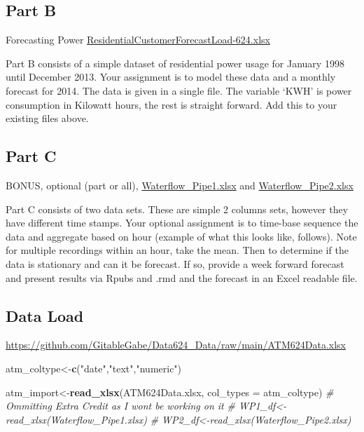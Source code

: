 \documentclass[
]{article}
\newenvironment{Shaded}{\begin{snugshade}}{\end{snugshade}}
\newcommand{\AttributeTok}[1]{\textcolor[rgb]{0.13,0.29,0.53}{#1}}
\newcommand{\CommentTok}[1]{\textcolor[rgb]{0.56,0.35,0.01}{\textit{#1}}}
\newcommand{\FunctionTok}[1]{\textcolor[rgb]{0.13,0.29,0.53}{\textbf{#1}}}
\newcommand{\NormalTok}[1]{#1}
\newcommand{\OtherTok}[1]{\textcolor[rgb]{0.56,0.35,0.01}{#1}}
\newcommand{\StringTok}[1]{\textcolor[rgb]{0.31,0.60,0.02}{#1}}
\begin{document}
\hypertarget{part-b}{%
\subsection{Part B}\label{part-b}}

Forecasting Power
\href{https://bbhosted.cuny.edu/bbcswebdav/pid-81630947-dt-content-rid-636015207_1/xid-636015207_1}{ResidentialCustomerForecastLoad-624.xlsx}

Part B consists of a simple dataset of residential power usage for
January 1998 until December 2013. Your assignment is to model these data
and a monthly forecast for 2014. The data is given in a single file. The
variable `KWH' is power consumption in Kilowatt hours, the rest is
straight forward. Add this to your existing files above.

\hypertarget{part-c}{%
\subsection{Part C}\label{part-c}}

BONUS, optional (part or all),
\href{https://bbhosted.cuny.edu/bbcswebdav/pid-81630948-dt-content-rid-636015213_1/xid-636015213_1}{Waterflow\_Pipe1.xlsx}
and
\href{https://bbhosted.cuny.edu/bbcswebdav/pid-81630949-dt-content-rid-636015214_1/xid-636015214_1}{Waterflow\_Pipe2.xlsx}

Part C consists of two data sets. These are simple 2 columns sets,
however they have different time stamps. Your optional assignment is to
time-base sequence the data and aggregate based on hour (example of what
this looks like, follows). Note for multiple recordings within an hour,
take the mean. Then to determine if the data is stationary and can it be
forecast. If so, provide a week forward forecast and present results via
Rpubs and .rmd and the forecast in an Excel readable file.

\hypertarget{data-load}{%
\subsection{Data Load}\label{data-load}}

\url{https://github.com/GitableGabe/Data624_Data/raw/main/ATM624Data.xlsx}

\begin{Shaded}
\begin{Highlighting}[]
\NormalTok{atm\_coltype}\OtherTok{\textless{}{-}}\FunctionTok{c}\NormalTok{(}\StringTok{"date"}\NormalTok{,}\StringTok{"text"}\NormalTok{,}\StringTok{"numeric"}\NormalTok{)}

\NormalTok{atm\_import}\OtherTok{\textless{}{-}}\FunctionTok{read\_xlsx}\NormalTok{(}\StringTok{\textquotesingle{}ATM624Data.xlsx\textquotesingle{}}\NormalTok{, }\AttributeTok{col\_types =}\NormalTok{ atm\_coltype)}
\CommentTok{\# Ommitting Extra Credit as I won\textquotesingle{}t be working on it}
\CommentTok{\# WP1\_df\textless{}{-}read\_xlsx(\textquotesingle{}Waterflow\_Pipe1.xlsx\textquotesingle{})}
\CommentTok{\# WP2\_df\textless{}{-}read\_xlsx(\textquotesingle{}Waterflow\_Pipe2.xlsx\textquotesingle{})}
\end{Highlighting}
\end{Shaded}
\end{document}
